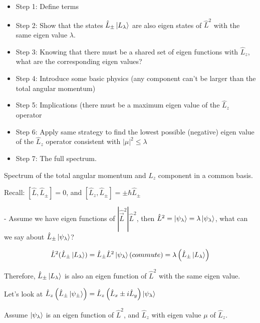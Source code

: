 \documentclass{article}
\begin{document}
\begin{itemize}
    \item  Step 1: Define terms

\item Step 2: Show that the states $\hat{L}_\pm \ket{L_\lambda}$ are also eigen states of $\hat{L}^2$  with the same eigen value $\lambda$.

\item Step 3: Knowing that there must be a shared set of eigen functions with $\hat{L}_z$, what are the corresponding eigen values?

\item Step 4: Introduce some basic physics (any component can’t be larger than the total angular momentum) 

\item Step 5: Implications (there must be a maximum eigen value of the $\hat{L}_z$ operator 

\item Step 6: Apply same strategy to find the lowest possible (negative) eigen value of the $\hat{L}_z$ operator consistent with $|\mu|^2 \leq \lambda$  

\item Step 7: The full spectrum.
\end{itemize}





 
 Spectrum of the total angular momentum and $L_z$ component in a common basis. 
 
 Recall: $[\hat{L}, \hat{L}_\pm] = 0$, and $[\hat{L}_z, \hat{L}_\pm] = \pm \hbar \hat{L}_\pm$
 
 - Assume we have eigen functions of $|\hat{\vec{L}}^2|  \hat{L}^2$, then $\hat{L}^2 = \ket{\psi_\lambda} = \lambda \ket{\psi_\lambda}$, what can we say about $\hat{L}_\pm \ket{\psi_\lambda}$?
 
 $$\hat{L}^2 (\hat{L}_\pm \ket{L_\lambda}) = \hat{L}_\pm \hat{L}^2 \ket{\psi_\lambda} (commute) = \lambda \left( \hat{L}_\pm \ket{L_\lambda} \right)$$
 
 Therefore, $ \hat{L}_\pm \ket{L_\lambda}$ is also an eigen function of $\hat{L}^2$ with the same eigen value. 
 
 Let's look at $\hat{L}_z \left( \hat{L}_\pm \ket{\psi_\pm} \right) = \hat{L}_z \left( \hat{L}_x \pm i \hat{L}_y \right) \ket{\psi_\lambda}$
 
 Assume  $\ket{\psi_\lambda}$ is an eigen function of $\hat{L}^2$, and $\hat{L}_z$ with eigen value $\mu$ of $\hat{L}_z$. 
 
\end{document}
